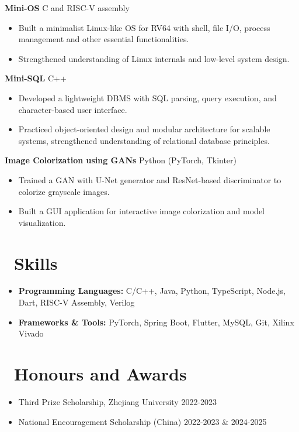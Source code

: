 \documentclass[11pt]{article}
\newlength{\interProjectSpacing}
\newcommand{\projectsep}{\vspace{\interProjectSpacing}}
\newlength{\intraProjectTitleSep}
\newcommand{\titlebreak}{\\[\intraProjectTitleSep]}
\begin{document}
\textbf{Mini-OS} \hfill C and RISC-V assembly \titlebreak
\begin{itemize}[nosep]
    \item Built a minimalist Linux-like OS for RV64 with shell, file I/O, process management and other essential functionalities.
    \item Strengthened understanding of Linux internals and low-level system design.
\end{itemize}

\projectsep

\textbf{Mini-SQL} \hfill C++ \titlebreak
\begin{itemize}[nosep]
    \item Developed a lightweight DBMS with SQL parsing, query execution, and character-based user interface.
    \item Practiced object-oriented design and modular architecture for scalable systems, strengthened understanding of relational database principles.
\end{itemize}

\projectsep

\textbf{Image Colorization using GANs} \hfill Python (PyTorch, Tkinter) \titlebreak
\begin{itemize}[nosep]
    \item Trained a GAN with U-Net generator and ResNet-based discriminator to colorize grayscale images.
    \item Built a GUI application for interactive image colorization and model visualization.
\end{itemize}

\section{\makebox[\widthof{\faCogs}][c]{\color{CVBlue}\faCogs}\ Skills}
\begin{itemize}[nosep]
    \item \textbf{Programming Languages:} C/C++, Java, Python, TypeScript, Node.js, Dart, RISC-V Assembly, Verilog
    \item \textbf{Frameworks \& Tools:} PyTorch, Spring Boot, Flutter, MySQL, Git, Xilinx Vivado
\end{itemize}

\section{\makebox[\widthof{\faTrophy}][c]{\color{CVBlue}\faTrophy}\ Honours and Awards}
\begin{itemize}
    \item Third Prize Scholarship, Zhejiang University \hfill 2022-2023
    \item National Encouragement Scholarship (China) \hfill 2022-2023 \& 2024-2025
\end{itemize}
\end{document}
